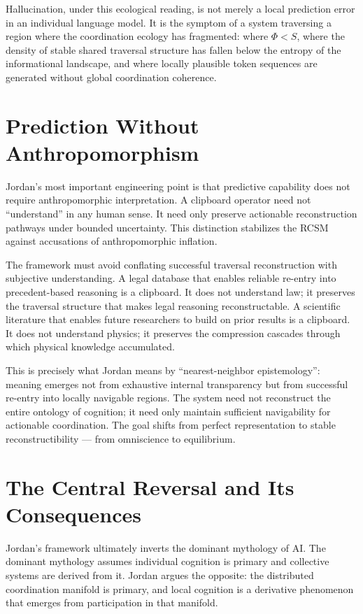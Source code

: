 \documentclass[12pt,oneside]{book}
\theoremstyle{plain}
\theoremstyle{definition}
\theoremstyle{plain}
\begin{document}
Hallucination, under this ecological reading, is not merely a local prediction error in an individual language model. It is the symptom of a system traversing a region where the coordination ecology has fragmented: where $\Phi < S$, where the density of stable shared traversal structure has fallen below the entropy of the informational landscape, and where locally plausible token sequences are generated without global coordination coherence.

\section{Prediction Without Anthropomorphism}

Jordan's most important engineering point is that predictive capability does not require anthropomorphic interpretation. A clipboard operator need not ``understand'' in any human sense. It need only preserve actionable reconstruction pathways under bounded uncertainty. This distinction stabilizes the RCSM against accusations of anthropomorphic inflation.

The framework must avoid conflating successful traversal reconstruction with subjective understanding. A legal database that enables reliable re-entry into precedent-based reasoning is a clipboard. It does not understand law; it preserves the traversal structure that makes legal reasoning reconstructable. A scientific literature that enables future researchers to build on prior results is a clipboard. It does not understand physics; it preserves the compression cascades through which physical knowledge accumulated.

This is precisely what Jordan means by ``nearest-neighbor epistemology'': meaning emerges not from exhaustive internal transparency but from successful re-entry into locally navigable regions. The system need not reconstruct the entire ontology of cognition; it need only maintain sufficient navigability for actionable coordination. The goal shifts from perfect representation to stable reconstructibility --- from omniscience to equilibrium.

\section{The Central Reversal and Its Consequences}

Jordan's framework ultimately inverts the dominant mythology of AI. The dominant mythology assumes individual cognition is primary and collective systems are derived from it. Jordan argues the opposite: the distributed coordination manifold is primary, and local cognition is a derivative phenomenon that emerges from participation in that manifold.
\end{document}

